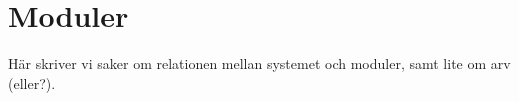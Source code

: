 \section{Moduler}
Här skriver vi saker om relationen mellan systemet och moduler, samt lite om arv
(eller?).
